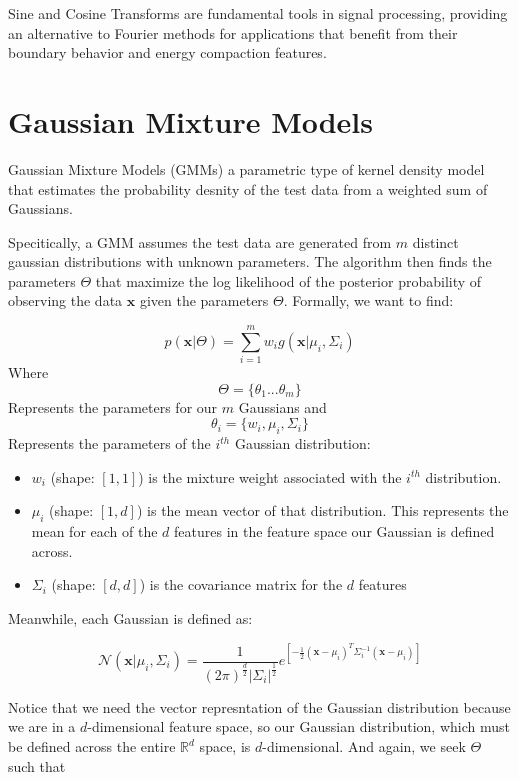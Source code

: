\documentclass[12pt]{article}
\begin{document}
Sine and Cosine Transforms are fundamental tools in signal processing, providing an alternative to Fourier methods for applications that benefit from their boundary behavior and energy compaction features.

\section{Gaussian Mixture Models}

Gaussian Mixture Models (GMMs) a parametric type of kernel density model that estimates the probability desnity of the test data from a weighted sum of Gaussians. 

Specitically, a GMM assumes the test data are generated from \(m\) distinct gaussian distributions with unknown parameters. The algorithm then finds the parameters \(\Theta\) that maximize the log likelihood of the posterior probability of observing the data \(\mathbf{x}\) given the parameters \(\Theta\). Formally, we want to find:

\[p(\mathbf{x}|\Theta) = \sum_{i=1}^m w_ig(\mathbf{x}|\mu_i, \Sigma_i)\]
Where 
\[\Theta = \{\theta_1 ... \theta_m\}\] 
Represents the parameters for our \(m\) Gaussians and 
 \[\theta_{i} = \{w_i, \mu_i, \Sigma_i\}\]
Represents the parameters of the \(i^{th}\) Gaussian distribution:
\begin{itemize}
\item \(w_i\) (shape: \([1, 1]\)) is the mixture weight associated with the \(i^{th}\) distribution.
\item  \(\mu_i\) (shape: \([1, d]\)) is the mean vector of that distribution. This represents the mean for each of the \(d\) features in the feature space our Gaussian is defined across. 
\item \(\Sigma_i\) (shape: \([d, d]\)) is the covariance matrix for the \(d\) features
\end{itemize}

Meanwhile, each Gaussian is defined as:

\[\mathcal{N}(\mathbf{x}|\mu_i, \Sigma_i) = \frac{1}{(2\pi)^{\frac{d}{2}} |\Sigma_i|^{\frac{1}{2}}}e^{\left[-\frac{1}{2} (\mathbf{x} - \mu_i)^T\Sigma_i^{-1}(\mathbf{x} - \mu_i)\right]} \]

Notice that we need the vector represntation of the Gaussian distribution because we are in a \(d\)-dimensional feature space, so our Gaussian distribution, which must be defined across the entire \(\mathbb{R}^d\) space, is \(d\)-dimensional. And again, we seek \(\Theta\) such that
\end{document}

